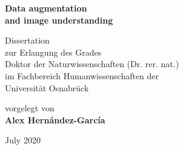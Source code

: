 {
\begin{titlepage}

    \begin{center}

	\Huge{\textbf{Data augmentation\\and image understanding}} \\
	
	\vspace{4.0cm}
	
	\Large{%
    Dissertation\\
    zur Erlangung des Grades\\
    Doktor der Naturwissenschaften (Dr. rer. nat.)\\
    im Fachbereich Humanwissenschaften der\\
    Universität Osnabrück}\\
	
	\vspace{2.0cm}
	
	\Large{vorgelegt von} \\
	\LARGE{\textbf{Alex Hern\'andez-Garc\'ia}} \\
	
	\vspace{0.5cm}

	\large{July 2020}
    \end{center}
  
\end{titlepage}
\cleardoublepage
}
